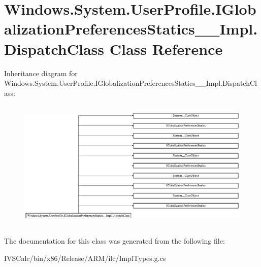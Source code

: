 \hypertarget{class_windows_1_1_system_1_1_user_profile_1_1_i_globalization_preferences_statics_____impl_1_1_dispatch_class}{}\section{Windows.\+System.\+User\+Profile.\+I\+Globalization\+Preferences\+Statics\+\_\+\+\_\+\+Impl.\+Dispatch\+Class Class Reference}
\label{class_windows_1_1_system_1_1_user_profile_1_1_i_globalization_preferences_statics_____impl_1_1_dispatch_class}
Inheritance diagram for Windows.\+System.\+User\+Profile.\+I\+Globalization\+Preferences\+Statics\+\_\+\+\_\+\+Impl.\+Dispatch\+Class\+:\begin{figure}[H]
\begin{center}
\leavevmode
\includegraphics[height=6.324435cm]{class_windows_1_1_system_1_1_user_profile_1_1_i_globalization_preferences_statics_____impl_1_1_dispatch_class}
\end{center}
\end{figure}


The documentation for this class was generated from the following file\+:\begin{DoxyCompactItemize}
\item 
I\+V\+S\+Calc/bin/x86/\+Release/\+A\+R\+M/ilc/Impl\+Types.\+g.\+cs\end{DoxyCompactItemize}

